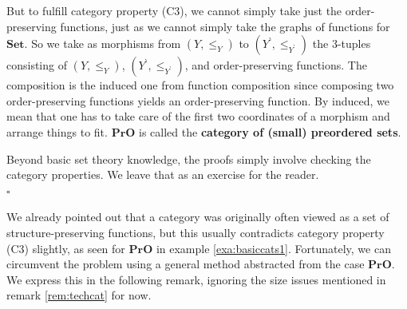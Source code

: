 \begin{exa}
\begin{enumerate}
But to fulfill category property (C3), we cannot simply take just the order-preserving functions, just as we cannot simply take the graphs of functions for $\mathbf{Set}$.
So we take as morphisms from $(Y,\leq_{Y})$ to $(Y^{\backprime},\leq_{Y^{\backprime}})$ the $3$-tuples consisting of $(Y,\leq_{Y})$, $(Y^{\backprime},\leq_{Y^{\backprime}})$, and order-preserving functions.
The composition is the induced one from function composition since composing two order-preserving functions yields an order-preserving function.
By induced, we mean that one has to take care of the first two coordinates of a morphism and arrange things to fit.
$\mathbf{PrO}$ is called the \textbf{category of (small) preordered sets}.
\end{enumerate}
\end{exa}
\begin{prf}
Beyond basic set theory knowledge, the proofs simply involve checking the category properties.
We leave that as an exercise for the reader.
\\
\phantom{proven}
\hfill
$\square$
\end{prf}
We already pointed out that a category was originally often viewed as a set of structure-preserving functions, but this usually contradicts category property (C3) slightly, as seen for $\mathbf{PrO}$ in example \ref{exa:basiccats1}.
Fortunately, we can circumvent the problem using a general method abstracted from the case $\mathbf{PrO}$.
We express this in the following remark, ignoring the size issues mentioned in remark \ref{rem:techcat} for now.
\\
